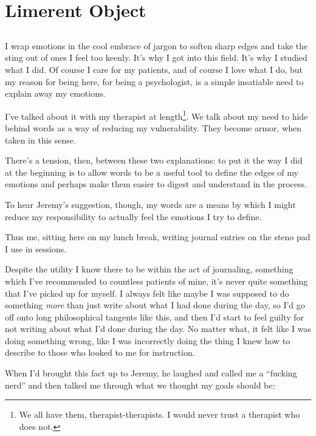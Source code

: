 \chapter{Limerent Object}

\section{}

I wrap emotions in the cool embrace of jargon to soften sharp edges and take the sting out of ones I feel too keenly. It's why I got into this field. It's why I studied what I did. Of course I care for my patients, and of course I love what I do, but my reason for being here, for being a psychologist, is a simple insatiable need to explain away my emotions.

I've talked about it with my therapist at length\footnote{We all have them, therapist-therapists. I would never trust a therapist who does not.}. We talk about my need to hide behind words as a way of reducing my vulnerability. They become armor, when taken in this sense.

There's a tension, then, between these two explanations: to put it the way I did at the beginning is to allow words to be a useful tool to define the edges of my emotions and perhaps make them easier to digest and understand in the process.

To hear Jeremy's suggestion, though, my words are a means by which I might reduce my responsibility to actually feel the emotions I try to define.

Thus me, sitting here on my lunch break, writing journal entries on the steno pad I use in sessions.

Despite the utility I know there to be within the act of journaling, something which I've recommended to countless patients of mine, it's never quite something that I've picked up for myself. I always felt like maybe I was supposed to do something \emph{more} than just write about what I had done during the day, so I'd go off onto long philosophical tangents like this, and then I'd start to feel guilty for not writing about what I'd done during the day. No matter what, it felt like I was doing something wrong, like I was incorrectly doing the thing I knew how to describe to those who looked to me for instruction.

When I'd brought this fact up to Jeremy, he laughed and called me a ``fucking nerd'' and then talked me through what we thought my goals should be:

